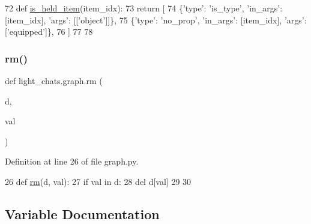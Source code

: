 \begin{DoxyCode}
72 \textcolor{keyword}{def }\hyperlink{namespacelight__chats_1_1graph_aa0be6ee7e9f549a7195bea9dfb962ad6}{is\_held\_item}(item\_idx):
73     \textcolor{keywordflow}{return} [
74         \{\textcolor{stringliteral}{'type'}: \textcolor{stringliteral}{'is\_type'}, \textcolor{stringliteral}{'in\_args'}: [item\_idx], \textcolor{stringliteral}{'args'}: [[\textcolor{stringliteral}{'object'}]]\},
75         \{\textcolor{stringliteral}{'type'}: \textcolor{stringliteral}{'no\_prop'}, \textcolor{stringliteral}{'in\_args'}: [item\_idx], \textcolor{stringliteral}{'args'}: [\textcolor{stringliteral}{'equipped'}]\},
76     ]
77 
78 
\end{DoxyCode}
\mbox{\label{namespacelight__chats_1_1graph_a1e4fb75c70e6fbe0b134e3fe135deeba}} 
\subsubsection{\texorpdfstring{rm()}{rm()}}
{\footnotesize\ttfamily def light\+\_\+chats.\+graph.\+rm (\begin{DoxyParamCaption}\item[{}]{d,  }\item[{}]{val }\end{DoxyParamCaption})}



Definition at line 26 of file graph.\+py.


\begin{DoxyCode}
26 \textcolor{keyword}{def }\hyperlink{namespaceprojects_1_1mastering__the__dungeon_1_1tasks_1_1graph__world2_1_1graph_a0da062d03bdfbab1c65ea71371c0c469}{rm}(d, val):
27     \textcolor{keywordflow}{if} val \textcolor{keywordflow}{in} d:
28         del d[val]
29 
30 
\end{DoxyCode}


\subsection{Variable Documentation}
\mbox{\label{namespacelight__chats_1_1graph_a7e5077a2835b09d1868590c141a4eb79}} 
